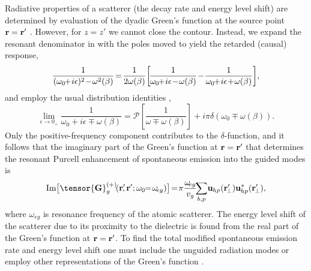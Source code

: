 \documentclass[aps,pra,twocolumn]{revtex4-1} %
\begin{document}
Radiative properties of a scatterer (the decay rate and energy level shift) are determined by evaluation of the dyadic Green's function at the source point $\mathbf{r} = \mathbf{r}'$ \cite{fussell_decay_2005}.  However, for $z=z'$ we cannot close the contour. Instead, we expand the resonant denominator in  with the poles moved to yield the retarded (causal) response,
\begin{equation}
\frac{1}{(\omega_0\!\!+\! i\epsilon)^2\!-\!\omega^2(\beta)} \!=\!\frac{1}{2 \omega(\beta)}\!\left[\! \frac{1}{\omega_0\!\!+\! i 
\epsilon \!-\! \omega(\beta)} \!-\! \frac{1}{\omega_0\!\!+\! i \epsilon \!+\! \omega(\beta)} \right]\!,\nn
\end{equation}
 and employ the usual distribution identities \cite{sondergaard_general_2001},
\begin{equation}
\!\!\!\!\lim_{\epsilon \!\rightarrow 0_+} \frac{1}{\omega_0 \!+\! i \epsilon \!\mp\! 
\omega(\beta)}=\mathcal{P}\left[\frac{1}{\omega \!\mp\! \omega(\beta)} \right] \!+\! i \pi \delta (\omega_0 \!\mp\! 
\omega(\beta)).
\end{equation}
Only the positive-frequency component contributes to the $\delta$-function, and it follows that the imaginary part of the Green's function at $\mathbf{r} = \mathbf{r}'$ that determines the resonant Purcell enhancement of spontaneous emission into the guided modes is \cite{dung_spontaneous_2000, fussell_decay_2005, chen_finite-element_2010}
	\begin{equation}\label{Eq::ImGreenLocal}
		{\rm Im} \big[\tensor{\mathbf{G}}^{(+)}_g\!(\br'\!\!,\br'; \omega_0\!\!=\!\omega\!_{eg}) \big] \!=\! \pi \frac{\omega\!_{eg}}{v_g }\!\! \sum_{b, p}\! 
		\mathbf{u}_{b\!, p} (\br_{\!\perp}^\prime)\mathbf{u}^*_{b\! , p} (\br_{\!\perp}^\prime),
	\end{equation}
where $\omega_{eg}$ is resonance frequency of the atomic scatterer.  The energy level shift of the scatterer due to its proximity to the dielectric is found from the real part of the Green's function at $\mathbf{r} = \mathbf{r}'$. 
To find the total modified spontaneous emission rate and energy level shift one must include the unguided radiation modes \cite{le_kien_spontaneous_2005} or employ other representations of the Green's function \cite{klimov_spontaneous_2004}.  
\end{document}
